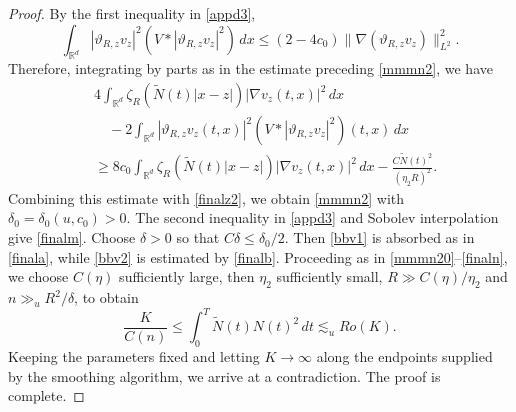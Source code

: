 \documentclass[reqno,11pt]{amsart}
\theoremstyle{plain}
\theoremstyle{definition}
\numberwithin{equation}{section}
\numberwithin{theorem}{section}
\def\geq{\geqslant}
\def\leq{\leqslant}
\def\R{\mathbb{R}}
\begin{document}
\begin{proof}
By the first inequality in \eqref{appd3},
\[
 \int_{\R^d}|\vartheta_{R,z}v_z|^2
                  (V*|\vartheta_{R,z}v_z|^2)\,dx
 \leq(2-4c_0)\|\nabla(\vartheta_{R,z}v_z)\|_{L^2}^2.
\]
Therefore, integrating by parts as in the estimate preceding \eqref{mmmn2},
we have
\begin{align*}
 &4\int_{\R^d}\zeta_R(\tilde N(t)|x-z|)|\nabla v_z(t,x)|^2\,dx\\
 &\quad-2\int_{\R^d}|\vartheta_{R,z}v_z(t,x)|^2
                         (V*|\vartheta_{R,z}v_z|^2)(t,x)\,dx\\
 &\geq8c_0\int_{\R^d}\zeta_R(\tilde N(t)|x-z|)
                         |\nabla v_z(t,x)|^2\,dx
          -\frac{C\tilde N(t)^2}{(\eta_2R)^2}.
\end{align*}
Combining this estimate with \eqref{finalz2}, we obtain \eqref{mmmn2}
with $\delta_0=\delta_0(u,c_0)>0$. The second inequality in \eqref{appd3}
and Sobolev interpolation give \eqref{finalm}. Choose $\delta>0$ so that
$C\delta\leq\delta_0/2$. Then \eqref{bbv1} is absorbed as in
\eqref{finala}, while \eqref{bbv2} is estimated by \eqref{finalb}.
Proceeding as in \eqref{mmmn20}--\eqref{finaln}, we choose $C(\eta)$
sufficiently large, then $\eta_2$ sufficiently small,
$R\gg C(\eta)/\eta_2$ and $n\gg_uR^2/\delta$, to obtain
\[
 \frac{K}{C(n)}
 \leq\int_0^T\tilde N(t)N(t)^2\,dt\lesssim_u Ro(K).
\]
Keeping the parameters fixed and letting $K\to\infty$ along the
endpoints supplied by the smoothing algorithm, we arrive at a contradiction.
The proof is complete.
\end{proof}
\end{document}
